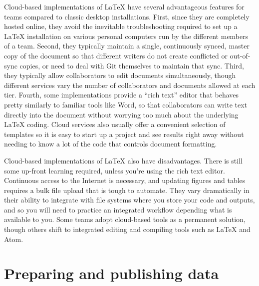 Cloud-based implementations of {\LaTeX} have several advantageous features
for teams compared to classic desktop installations.
First, since they are completely hosted online,
they avoid the inevitable troubleshooting required to set up a {\LaTeX} installation
on various personal computers run by the different members of a team.
Second, they typically maintain a single, continuously synced, master copy of the document
so that different writers do not create conflicted or out-of-sync copies,
or need to deal with Git themselves to maintain that sync.
Third, they typically allow collaborators to edit documents simultaneously,
though different services vary the number of collaborators and documents allowed at each tier.
Fourth, some implementations provide a ``rich text'' editor
that behaves pretty similarly to familiar tools like Word,
so that collaborators can write text directly into the document without worrying too much
about the underlying {\LaTeX} coding.
Cloud services also usually offer a convenient selection of templates
so it is easy to start up a project and see results right away
without needing to know a lot of the code that controls document formatting.

Cloud-based implementations of {\LaTeX} also have disadvantages.
There is still some up-front learning required, unless you're using the rich text editor.
Continuous access to the Internet is necessary,
and updating figures and tables requires a bulk file upload that is tough to automate.
They vary dramatically in their ability to integrate
with file systems where you store your code and outputs,
and so you will need to practice an integrated workflow depending what is available to you.
Some teams adopt cloud-based tools as a permanent solution,
though others shift to integrated editing and compiling tools such as {\LaTeX} and Atom. 


\section{Preparing and publishing data}

